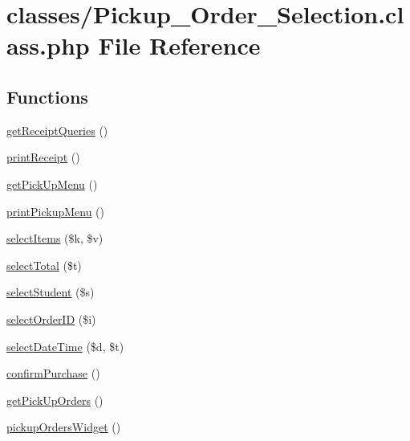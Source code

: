 \hypertarget{_pickup___order___selection_8class_8php}{}\section{classes/\+Pickup\+\_\+\+Order\+\_\+\+Selection.class.\+php File Reference}
\label{_pickup___order___selection_8class_8php}
\subsection*{Functions}
\begin{DoxyCompactItemize}
\item 
\mbox{\hyperlink{_pickup___order___selection_8class_8php_afea91457e1886d995f1a6de7439ceaeb}{get\+Receipt\+Queries}} ()
\item 
\mbox{\hyperlink{_pickup___order___selection_8class_8php_a3b05a1e41412a6594da4671a32eb73cd}{print\+Receipt}} ()
\item 
\mbox{\hyperlink{_pickup___order___selection_8class_8php_ad9a4c0f627cd2a6db20fe86395ba89eb}{get\+Pick\+Up\+Menu}} ()
\item 
\mbox{\hyperlink{_pickup___order___selection_8class_8php_a59933fbd264fc2a62d9a74e50ebb98fd}{print\+Pickup\+Menu}} ()
\item 
\mbox{\hyperlink{_pickup___order___selection_8class_8php_ab30920ac61f282a414092277587a25a1}{select\+Items}} (\$k, \$v)
\item 
\mbox{\hyperlink{_pickup___order___selection_8class_8php_a8479e007f854c94229714a8425c5b6c0}{select\+Total}} (\$t)
\item 
\mbox{\hyperlink{_pickup___order___selection_8class_8php_aa3d29d516196eed16f5553dd20b8011e}{select\+Student}} (\$s)
\item 
\mbox{\hyperlink{_pickup___order___selection_8class_8php_ad8c931daea4616337e35d0add407efa0}{select\+Order\+ID}} (\$i)
\item 
\mbox{\hyperlink{_pickup___order___selection_8class_8php_a6481f7053a635ccc85738d41bc186de2}{select\+Date\+Time}} (\$d, \$t)
\item 
\mbox{\hyperlink{_pickup___order___selection_8class_8php_a539ea0c001b23b8d52ffadcec3bc3174}{confirm\+Purchase}} ()
\item 
\mbox{\hyperlink{_pickup___order___selection_8class_8php_a610ed5203a0a81eb865c12a6ce45f5b8}{get\+Pick\+Up\+Orders}} ()
\item 
\mbox{\hyperlink{_pickup___order___selection_8class_8php_a5cb8f6b7424fd9b9178daeaf22b9d31f}{pickup\+Orders\+Widget}} ()
\end{DoxyCompactItemize}
